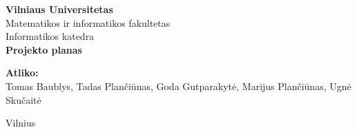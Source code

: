\documentclass[a4paper]{article}
\begin{document}
\begin{titlepage}
    \centering
    
    {\Large \textbf{Vilniaus Universitetas}}\\[0.2cm]
    {\small Matematikos ir informatikos fakultetas}\\[0.1cm]
    {\small Informatikos katedra}\\[4cm]

    {\huge \textbf{Projekto planas}}\\[4cm]

    \begin{raggedleft}
    \begin{minipage}{0.55\textwidth}
        \textbf{Atliko:}\\
        Tomas Baublys, Tadas Plančiūnas, Goda Gutparakytė, Marijus Plančiūnas, Ugnė Skučaitė\\[0.8cm]
    \end{minipage}
    \end{raggedleft}

    \vfill

    Vilnius \\ \the\year

\end{titlepage}

\pagebreak

\tableofcontents
\pagebreak









\appendix
\makeatletter
\def\priedas@section{~priedas.}
\renewcommand\@seccntformat[1]{\csname the#1\endcsname\csname priedas@#1\endcsname\quad}
\makeatother

\end{document}
